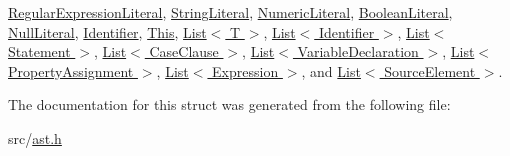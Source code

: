\hyperlink{struct_regular_expression_literal_a0df8cb8e68e12de1751821c9a1c60617}{Regular\+Expression\+Literal}, \hyperlink{struct_string_literal_a796470cf5573384c12d62520728dea26}{String\+Literal}, \hyperlink{struct_numeric_literal_aa18c06c1b739ba725cad0593c6bde1f4}{Numeric\+Literal}, \hyperlink{struct_boolean_literal_aeb7a30e2b22ac6ad12723da1e72087c5}{Boolean\+Literal}, \hyperlink{struct_null_literal_a988e617d768c43d45b330dc8ed245b72}{Null\+Literal}, \hyperlink{struct_identifier_acc1d00e56e626c8398b4e995578d6769}{Identifier}, \hyperlink{struct_this_a9ff113a898e7756ce6854c8167dddb15}{This}, \hyperlink{struct_list_a9d87bf19af4c0cca46520b694da550f0}{List$<$ T $>$}, \hyperlink{struct_list_a9d87bf19af4c0cca46520b694da550f0}{List$<$ Identifier $>$}, \hyperlink{struct_list_a9d87bf19af4c0cca46520b694da550f0}{List$<$ Statement $>$}, \hyperlink{struct_list_a9d87bf19af4c0cca46520b694da550f0}{List$<$ Case\+Clause $>$}, \hyperlink{struct_list_a9d87bf19af4c0cca46520b694da550f0}{List$<$ Variable\+Declaration $>$}, \hyperlink{struct_list_a9d87bf19af4c0cca46520b694da550f0}{List$<$ Property\+Assignment $>$}, \hyperlink{struct_list_a9d87bf19af4c0cca46520b694da550f0}{List$<$ Expression $>$}, and \hyperlink{struct_list_a9d87bf19af4c0cca46520b694da550f0}{List$<$ Source\+Element $>$}.



The documentation for this struct was generated from the following file\+:\begin{DoxyCompactItemize}
\item 
src/\hyperlink{ast_8h}{ast.\+h}\end{DoxyCompactItemize}
